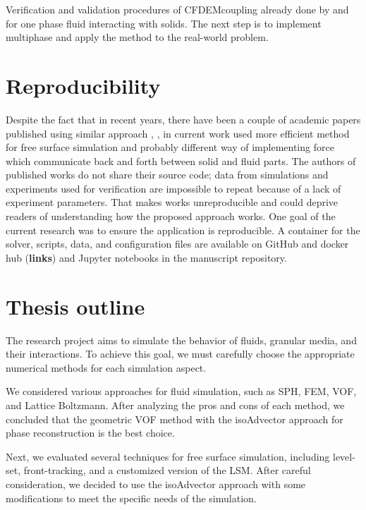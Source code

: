 Verification and validation procedures of CFDEMcoupling \cite{kloss2011liggghts} already done by \cite{hager2014cfd} and \cite{balachandran2021resolved} for one phase fluid interacting with solids. The next step is to implement multiphase and apply the method to the real-world problem.

\section{Reproducibility}

Despite the fact that in recent years, there have been a couple of academic papers published using similar approach \cite{nan2023high}, \cite{mao2020resolved}, in current work used more efficient method for free surface simulation and probably different way of implementing force which communicate back and forth between solid and fluid parts. The authors of published works do not share their source code; data from simulations and experiments used for verification are impossible to repeat because of a lack of experiment parameters. That makes works unreproducible and could deprive readers of understanding how the proposed approach works. One goal of the current research was to ensure the application is reproducible. A container for the solver, scripts, data, and configuration files are available on GitHub and docker hub (\textbf{links}) and Jupyter notebooks in the manuscript repository.

\section{Thesis outline}

The research project aims to simulate the behavior of fluids, granular media, and their interactions. To achieve this goal, we must carefully choose the appropriate numerical methods for each simulation aspect.

We considered various approaches for fluid simulation, such as SPH, FEM, VOF, and Lattice Boltzmann. After analyzing the pros and cons of each method, we concluded that the geometric VOF method with the isoAdvector approach for phase reconstruction is the best choice.

Next, we evaluated several techniques for free surface simulation, including level-set, front-tracking, and a customized version of the LSM. After careful consideration, we decided to use the isoAdvector approach with some modifications to meet the specific needs of the simulation.

